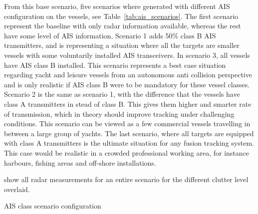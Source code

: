 From this base scenario, five scenarios where generated with different AIS configuration on the vessels, see Table~\ref{tab:ais_scenarios}. The first scenario represent the baseline with only radar information available, whereas the rest have some level of AIS information. Scenario 1 adds 50\% class B AIS transmitters, and is representing a situation where all the targets are smaller vessels with some voluntarily installed AIS transceivers. In scenario 3, all vessels have AIS class B installed. This scenario represents a best case situation regarding yacht and leisure vessels from an autonomous anti collision perspective and is only realistic if AIS class B were to be mandatory for these vessel classes. Scenario 2 is the same as scenario 1, with the difference that the vessels have class A transmitters in stead of class B. This gives them higher and smarter rate of transmission, which in theory should improve tracking under challenging conditions. This scenario can be viewed as a few commercial vessels travelling in between a large group of yachts. The last scenario, where all targets are equipped with class A transmitters is the ultimate situation for any fusion tracking system. This case would be realistic in a crowded professional working area, for instance harbours, fishing areas and off-shore installations.

 show all radar measurements for an entire scenario for the different clutter level overlaid. 
\begin{table}
\centering
{}
\caption{AIS class scenario configuration}\label{tab:ais_scenarios}
\end{table}

